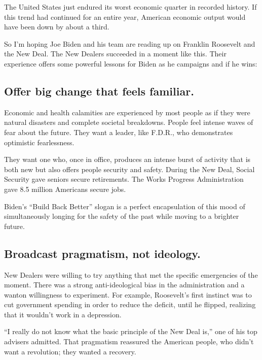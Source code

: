 The United States just endured its worst economic quarter in recorded
history. If this trend had continued for an entire year, American
economic output would have been down by about a third.

So I'm hoping Joe Biden and his team are reading up on Franklin
Roosevelt and the New Deal. The New Dealers succeeded in a moment like
this. Their experience offers some powerful lessons for Biden as he
campaigns and if he wins:

\hypertarget{offer-big-change-that-feels-familiar}{%
\subsection{Offer big change that feels
familiar.}\label{offer-big-change-that-feels-familiar}}

Economic and health calamities are experienced by most people as if they
were natural disasters and complete societal breakdowns. People feel
intense waves of fear about the future. They want a leader, like F.D.R.,
who demonstrates optimistic fearlessness.

They want one who, once in office, produces an intense burst of activity
that is both new but also offers people security and safety. During the
New Deal, Social Security gave seniors secure retirements. The Works
Progress Administration gave 8.5 million Americans secure jobs.

Biden's ``Build Back Better'' slogan is a perfect encapsulation of this
mood of simultaneously longing for the safety of the past while moving
to a brighter future.

\hypertarget{broadcast-pragmatism-not-ideology}{%
\subsection{Broadcast pragmatism, not
ideology.}\label{broadcast-pragmatism-not-ideology}}

New Dealers were willing to try anything that met the specific
emergencies of the moment. There was a strong anti-ideological bias in
the administration and a wanton willingness to experiment. For example,
Roosevelt's first instinct was to cut government spending in order to
reduce the deficit, until he flipped, realizing that it wouldn't work in
a depression.

``I really do not know what the basic principle of the New Deal is,''
one of his top advisers admitted. That pragmatism reassured the American
people, who didn't want a revolution; they wanted a recovery.

